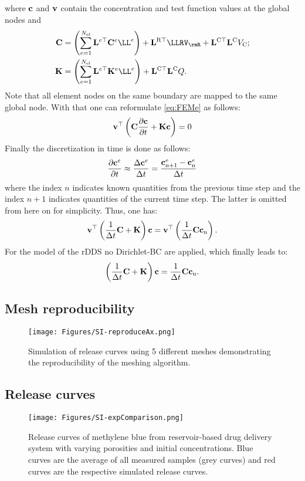 \documentclass{article}
\begin{document}
  where ${\bf{c}}$ and ${\bf{v}}$ contain the concentration and test function values at the global nodes and
  \begin{align}
    \CC &= \left(\sumel \LLeT \CCe \LL^e\right) + \LLRT\LLRV_\rmR + \LLCT\LLC\VC; \\
    \KK &= \left(\sumel \LLeT \KKe \LL^e\right) + \LLCT\LLC Q.
  \end{align}
  Note that all element nodes on the same boundary are mapped to the same global node. With that one can reformulate \cref{eq:FEMe} as follows:
  \begin{equation}
    {\bf{v}}^{\top} \left({\bf{C}} \frac{\partial {\bf{c}}}{\partial t} + {\bf{K}} {\bf{c}} \right) = 0 \label{eq:FEM}
  \end{equation}
  Finally the discretization in time is done as follows:
  \begin{equation}
    \frac{\partial {\bf{c}}^e}{\partial t} \approx \frac{\Delta {\bf{c}}^e}{\Delta t}  = \frac{{\bf{c}}^e_{\rm n+1}-{\bf{c}}^e_{\rm n}}{\Delta t}
  \end{equation}
  where the index $n$ indicates known quantities from the previous time step and the index $n+1$ indicates quantities of the current time step. The latter is omitted from here on for simplicity.
  Thus, one has: 
  \begin{equation}
    {\bf{v}}^{\top} \left( \frac{1}{\Delta t}{\bf{C}}+ {\bf{K}} \right) {\bf{c}} = {\bf{v}}^{\top} \left(\frac{1}{\Delta t} {\bf{C}} {\bf{c}}_{\rm n}\right).
  \end{equation}
  For the model of the rDDS no Dirichlet-BC are applied, which finally leads to: 
  \begin{equation}
    \left( \frac{1}{\Delta t}{\bf{C}}+ {\bf{K}} \right) {\bf{c}} = \frac{1}{\Delta t}{\bf{C}} {\bf{c}}_{\rm n}.
  \end{equation} 

  \newpage
  \subsection*{Mesh reproducibility}
  \begin{figure}[h!]
    \texttt{[image: Figures/SI-reproduceAx.png]}
    \caption{Simulation of release curves using 5 different meshes demonstrating the reproducibility of the meshing algorithm.}
  \end{figure}

  \newpage
  \subsection*{Release curves}
  \begin{figure}[h!]
    \texttt{[image: Figures/SI-expComparison.png]}
    \caption{Release curves of methylene blue from reservoir-based drug delivery system with varying porosities and initial concentrations. Blue curves are the average of all measured samples (grey curves) and red curves are the respective simulated release curves. }
  \end{figure}
\end{document}
